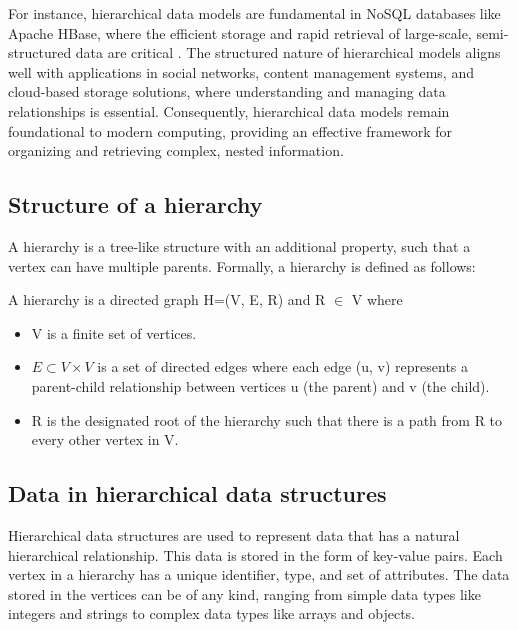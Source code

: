For instance, hierarchical data models are fundamental in NoSQL databases like Apache HBase, where the efficient storage and rapid retrieval of large-scale, semi-structured data are critical \cite{DBLP:books/daglib/0027893}. The structured nature of hierarchical models aligns well with applications in social networks, content management systems, and cloud-based storage solutions, where understanding and managing data relationships is essential.
Consequently, hierarchical data models remain foundational to modern computing, providing an effective framework for organizing and retrieving complex, nested information.

\subsection{Structure of a hierarchy}
A hierarchy is a tree-like structure with an additional property, such that a vertex can have multiple parents.
Formally, a hierarchy is defined as follows:

\begin{definition}
    A hierarchy is a directed graph H=(V, E, R) and R $\in$ V where
    \begin{itemize}
        \item V is a finite set of vertices.
        \item $E \subset V \times V$ is a set of directed edges where each edge (u, v) represents a parent-child relationship between vertices u (the parent) and v (the child).
        \item R is the designated root of the hierarchy such that there is a path from R to every other vertex in V.
        
    \end{itemize} 
\end{definition}

\subsection{Data in hierarchical data structures}

Hierarchical data structures are used to represent data that has a natural hierarchical relationship. This data is stored in the form of key-value pairs. Each vertex in a hierarchy has a unique identifier, type, and set of attributes. The data stored in the vertices can be of any kind, ranging from simple data types like integers and strings to complex data types like arrays and objects. 

